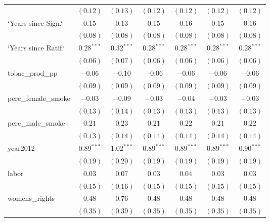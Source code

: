 \begin{table}[!h]
\begin{center}
\begin{tabular}{l c c c c c c }
                        & $(0.12)$     & $(0.13)$      & $(0.12)$     & $(0.12)$     & $(0.12)$     & $(0.12)$     \\
`Years since Sign.`     & $0.15$       & $0.13$        & $0.15$       & $0.16$       & $0.15$       & $0.16$       \\
                        & $(0.08)$     & $(0.08)$      & $(0.08)$     & $(0.08)$     & $(0.08)$     & $(0.08)$     \\
`Years since Ratif.`    & $0.28^{***}$ & $0.32^{***}$  & $0.28^{***}$ & $0.28^{***}$ & $0.28^{***}$ & $0.28^{***}$ \\
                        & $(0.06)$     & $(0.07)$      & $(0.06)$     & $(0.06)$     & $(0.06)$     & $(0.06)$     \\
tobac\_prod\_pp         & $-0.06$      & $-0.10$       & $-0.06$      & $-0.06$      & $-0.06$      & $-0.06$      \\
                        & $(0.09)$     & $(0.09)$      & $(0.09)$     & $(0.09)$     & $(0.09)$     & $(0.09)$     \\
perc\_female\_smoke     & $-0.03$      & $-0.09$       & $-0.03$      & $-0.04$      & $-0.03$      & $-0.03$      \\
                        & $(0.13)$     & $(0.14)$      & $(0.13)$     & $(0.13)$     & $(0.13)$     & $(0.13)$     \\
perc\_male\_smoke       & $0.21$       & $0.23$        & $0.21$       & $0.22$       & $0.21$       & $0.22$       \\
                        & $(0.13)$     & $(0.14)$      & $(0.14)$     & $(0.14)$     & $(0.14)$     & $(0.14)$     \\
year2012                & $0.89^{***}$ & $1.02^{***}$  & $0.89^{***}$ & $0.89^{***}$ & $0.89^{***}$ & $0.90^{***}$ \\
                        & $(0.19)$     & $(0.20)$      & $(0.19)$     & $(0.19)$     & $(0.19)$     & $(0.19)$     \\
labor                   & $0.03$       & $0.07$        & $0.03$       & $0.04$       & $0.03$       & $0.03$       \\
                        & $(0.15)$     & $(0.16)$      & $(0.15)$     & $(0.15)$     & $(0.15)$     & $(0.15)$     \\
womens\_rights          & $0.48$       & $0.76$        & $0.48$       & $0.48$       & $0.48$       & $0.48$       \\
                        & $(0.35)$     & $(0.39)$      & $(0.35)$     & $(0.35)$     & $(0.35)$     & $(0.35)$     \\

\end{tabular}
\end{center}
\end{table}
